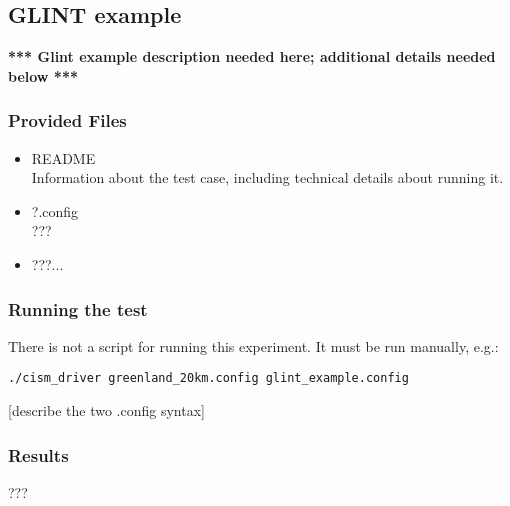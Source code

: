 \subsection{GLINT example}
\label{sec:glint_example}

\textbf{ *** Glint example description needed here; additional details needed below *** }

\subsubsection{Provided Files}

\begin{itemize}
	\item README \\
		Information about the test case, including technical details about running it.
\item ?.config \\
  ???
\item ???... \\
\end{itemize}

\subsubsection{Running the test}
There is not a script for running this experiment.  It must be run manually, e.g.: 

\texttt{./cism\_driver greenland\_20km.config glint\_example.config}

[describe the two .config syntax]

\subsubsection{Results}
???



